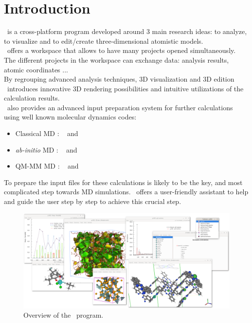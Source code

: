 \chapter{Introduction}

\atomes\ is a cross-platform program developed around 3 main research ideas: to analyze, 
to visualize and to edit/create three-dimensional atomistic models. \\
\atomes\ offers a workspace that allows to have many projects opened simultaneously. 
The different projects in the workspace can exchange data: analysis results, atomic coordinates ... \\
By regrouping advanced analysis techniques, 3D visualization and 3D edition \atomes\ introduces innovative 3D rendering possibilities 
and intuitive utilizations of the calculation results. \\[0.25cm]
\atomes\ also provides an advanced input preparation system for further calculations using well known molecular dynamics codes: 
\begin{itemize}
\item Classical MD : \dlpoly\ \cite{DLPOLY} and \lammps\ \cite{LAMMPS}
\item {\em{ab-initio}} MD : \cpmd\ \cite{CPMD} and \cptk\ \cite{CP2K}
\item QM-MM MD : \cpmd\ \cite{CPMD} and \cptk\ \cite{CP2K}
\end{itemize}
\noindent To prepare the input files for these calculations is likely to be the key, and most complicated step towards MD simulations. 
\atomes\ offers a user-friendly assistant to help and guide the user step by step to achieve this crucial step. 
\begin{figure}[!p]
\hypertarget{overview}{
\begin{center}
\includegraphics*[width=23cm, angle=90, keepaspectratio=true, draft=\ddst]{img/overview3}
\end{center}
\caption{Overview of the \atomes\ program.}\label{overview}
}
\end{figure}
